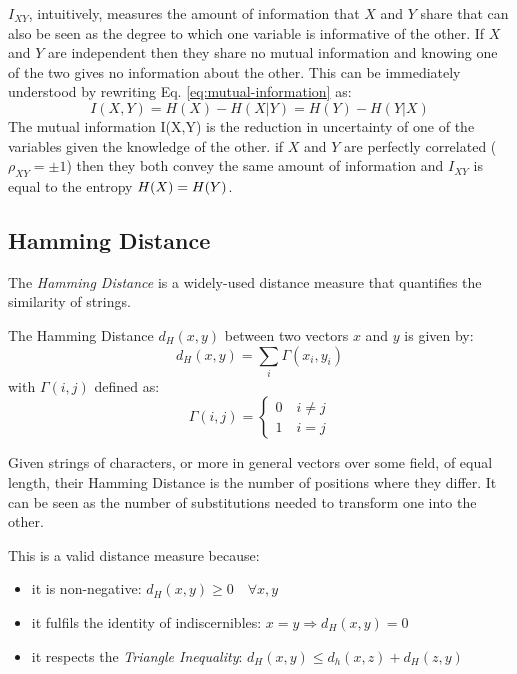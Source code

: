 $I_{XY}$, intuitively, measures the amount of information that $X$ and $Y$ share that can also be seen as the degree to which one variable is informative of the other.
If $X$ and $Y$ are independent then they share no mutual information and knowing one of the two gives no information about the other.
This can be immediately understood by rewriting Eq. \ref{eq:mutual-information} as:
\begin{equation}
	I(X,Y) = H(X) - H(X|Y) = H(Y) - H(Y|X)
\end{equation}
The mutual information I(X,Y) is the reduction in uncertainty of one of the variables given the knowledge of the other.
if $X$ and $Y$ are perfectly correlated ($\rho_{XY}= \pm 1$) then they both convey the same amount of information and $I_{XY}$ is equal to the entropy $H(X) = H(Y)$.

\subsection{Hamming Distance} \label{subsec:hamming-distance}
The \textit{Hamming Distance} is a widely-used distance measure that quantifies the similarity of strings.
\begin{definition}
	The Hamming Distance $d_H(x,y)$ between two vectors $x$ and $y$ is given by:
	\begin{equation}
		d_H(x,y) = \sum_i \Gamma(x_i, y_i)
	\end{equation}
	with $\Gamma(i,j)$ defined as:
	\begin{equation}
		\Gamma(i,j) = 
		\begin{cases}
			0 \quad i \neq j \\
			1 \quad i = j	
		\end{cases}
	\end{equation}
\end{definition}
Given strings of characters, or more in general vectors over some field, of equal length, their Hamming Distance is the number of positions where they differ.
It can be seen as the number of substitutions needed to transform one into the other.

This is a valid distance measure because:
\begin{itemize}
  \item it is non-negative: $d_H(x,y) \geq 0 \quad \forall x, y$
  \item it fulfils the identity of indiscernibles: $x = y \Rightarrow d_H(x,y)=0$
  \item it respects the \textit{Triangle Inequality}: $d_H(x,y) \leq d_h(x,z) + d_H(z,y) $
\end{itemize}

